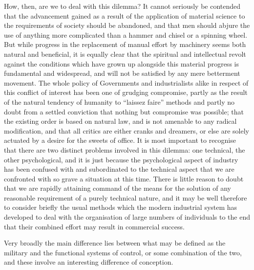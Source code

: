 \documentclass{book}
\begin{document}
How, then, are we to deal with this dilemma? It cannot seriously be contended that the advancement gained as a result of the application of material science to the requirements of society should be abandoned, and that men should abjure the use of anything more complicated than a hammer and chisel or a spinning wheel. But while progress in the replacement of manual effort by machinery seems both natural and beneficial, it is equally clear that the spiritual and intellectual revolt against the conditions which have grown up alongside this material progress is fundamental and widespread, and will not be satisfied by any mere betterment movement. The whole policy of Governments and industrialists alike in respect of this conflict of interest has been one of grudging compromise, partly as the result of the natural tendency of humanity to “laissez faire” methods and partly no doubt from a settled conviction that nothing but compromise was possible; that the existing order is based on natural law, and is not amenable to any radical modification, and that all critics are either cranks and dreamers, or else are solely actuated by a desire for the sweets of office. It is most important to recognise that there are two distinct problems involved in this dilemma: one technical, the other psychological, and it is just because the psychological aspect of industry has been confused with and subordinated to the technical aspect that we are confronted with so grave a situation at this time. There is little reason to doubt that we are rapidly attaining command of the means for the solution of any reasonable requirement of a purely technical nature, and it may be well therefore to consider briefly the usual methods which the modern industrial system has developed to deal with the organisation of large numbers of individuals to the end that their combined effort may result in commercial success.

Very broadly the main difference lies between what may be defined as the military and the functional systems of control, or some combination of the two, and these involve an interesting difference of conception.
\end{document}
